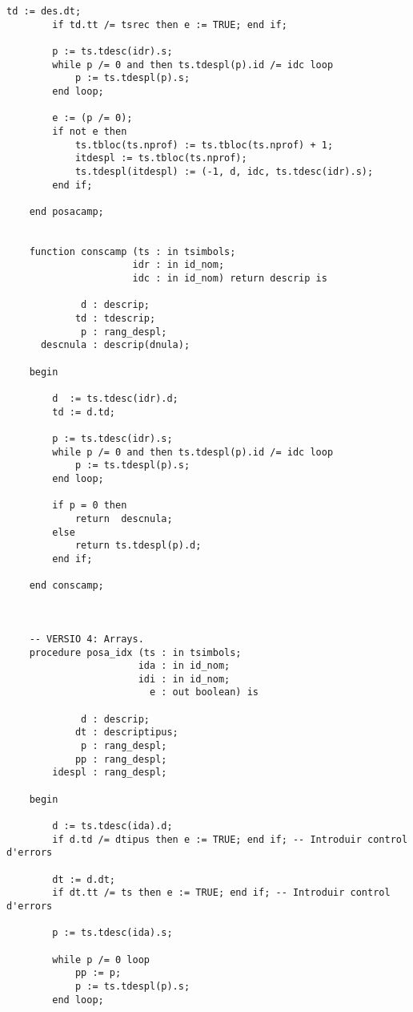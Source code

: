 \documentclass[10pt]{report}
\begin{document}
\begin{lstlisting}[style=Ada]
        td := des.dt;
        if td.tt /= tsrec then e := TRUE; end if;
        
        p := ts.tdesc(idr).s;
        while p /= 0 and then ts.tdespl(p).id /= idc loop
            p := ts.tdespl(p).s;
        end loop;
        
        e := (p /= 0);
        if not e then
            ts.tbloc(ts.nprof) := ts.tbloc(ts.nprof) + 1;
            itdespl := ts.tbloc(ts.nprof);
            ts.tdespl(itdespl) := (-1, d, idc, ts.tdesc(idr).s);
        end if;
        
    end posacamp;
    
    
    function conscamp (ts : in tsimbols;
                      idr : in id_nom;
                      idc : in id_nom) return descrip is
                       
             d : descrip;
            td : tdescrip;
             p : rang_despl;
      descnula : descrip(dnula);
                       
    begin
    
        d  := ts.tdesc(idr).d;
        td := d.td;
        
        p := ts.tdesc(idr).s;
        while p /= 0 and then ts.tdespl(p).id /= idc loop
            p := ts.tdespl(p).s;
        end loop;
        
        if p = 0 then
            return  descnula;
        else
            return ts.tdespl(p).d;
        end if;
    
    end conscamp;
    
    
    
    -- VERSIO 4: Arrays.
    procedure posa_idx (ts : in tsimbols;
                       ida : in id_nom;
                       idi : in id_nom;
                         e : out boolean) is
                        
             d : descrip;
            dt : descriptipus;
             p : rang_despl;
            pp : rang_despl;
        idespl : rang_despl;
                        
    begin
    
        d := ts.tdesc(ida).d;
        if d.td /= dtipus then e := TRUE; end if; -- Introduir control d'errors
        
        dt := d.dt;
        if dt.tt /= ts then e := TRUE; end if; -- Introduir control d'errors   
        
        p := ts.tdesc(ida).s;
        
        while p /= 0 loop
            pp := p;
            p := ts.tdespl(p).s;
        end loop;
        

\end{lstlisting}
\end{document}
